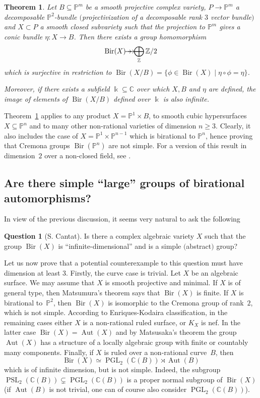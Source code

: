 \documentclass[JEP,XML,SOM,Unicode,NoFloatCountersInSection]{cedram}
\newcommand{\tto}{\mathchoice{\to\hspace*{-5mm}\to}{\to\hspace*{-2.85mm}\to}{\to\hspace*{-3mm}\to}{\to\hspace*{-3mm}\to}}
\DeclareMathOperator{\Bir}{Bir}
\DeclareMathOperator{\Aut}{Aut}
\DeclareMathOperator{\PGL}{PGL}
\DeclareMathOperator{\PSL}{PSL}
\theoremstyle{plain}
\newtheorem{thm}{Theorem}[section]
\theoremstyle{definition}
\newtheorem*{question}{Question}
\newcommand{\CC}{\mathbb C}
\newcommand{\kk}{\Bbbk}
\newcommand{\PP}{\mathbb P}
\newcommand{\ZZ}{\mathbb Z}
\begin{document}
\begin{thm}\label{thm: BLZ 1}
Let $B\subseteq \PP^m$ be a smooth projective complex variety, $P\to \PP^m$ a decomposable $\PP^2$-bundle $($projectivization of a decomposable rank $3$ vector bundle$)$ and $X\subset P$ a smooth closed subvariety such that the projection to $\PP^m$ gives a conic bundle $\eta\colon X\to B$.
Then there exists a group homomorphism
\[\Bir(X)\tto \bigoplus_\ZZ \ZZ/2\]
which is surjective in restriction to $\Bir(X/B)=\{\phi\in \Bir(X)\mid \eta\circ\phi=\eta\}$.

Moreover, if there exists a subfield $\kk\subseteq \CC$ over which $X,B$ and $\eta$ are defined, the image of elements of $\Bir(X/B)$ defined over $\kk$ is also infinite.
\end{thm}

Theorem~\ref{thm: BLZ 1} applies to any product $X = \PP^1 \times B$, to smooth cubic hypersurfaces $X \subseteq \PP^{n}$ and to many other non-rational varieties of dimension $n \ge 3$. Clearly, it also includes the case of $X = \PP^1 \times \PP^{n-1}$ which is birational to $\PP^n$, hence proving that Cremona groups $\Bir(\PP^n)$ are not simple. For a version of this result in dimension~$2$ over a non-closed field, see \cite{Schneider}.

\subsection{Are there simple ``large'' groups of birational automorphisms?} In view of the previous discussion, it seems very natural to ask the following

\begin{question}[S. Cantat]
Is there a complex algebraic variety $X$ such that the group $\Bir(X)$ is ``infinite-dimensional'' and is a simple $($abstract$)$ group?
\end{question}

Let us now prove that a potential counterexample to this question must have dimension at least $3$. Firstly, the curve case is trivial. Let $X$ be an algebraic surface. We may assume that $X$ is smooth projective and minimal. If $X$ is of general type, then Matsumura's theorem \cite{Matsumura} says that $\Bir(X)$ is finite. If $X$ is birational to~$\PP^2$, then $\Bir(X)$ is isomorphic to the Cremona group of rank~$2$, which is not simple. According to Enriques-Kodaira classification, in the remaining cases either $X$ is a non-rational ruled surface, or $K_X$ is nef. In the latter case $\Bir(X)=\Aut(X)$ and by Matsusaka's theorem \cite{Matsusaka} the group $\Aut(X)$ has a structure of a locally algebraic group with finite or countably many components. Finally, if $X$ is ruled over a non-rational curve~$B$, then
\[
\Bir(X)\simeq\PGL_2(\CC(B))\rtimes\Aut(B)
\]
which is of infinite dimension, but is not simple. Indeed, the subgroup $\PSL_2(\CC(B))\subsetneq \PGL_2(\CC(B))$ is a proper normal subgroup of $\Bir(X)$ (if $\Aut(B)$ is not trivial, one can of course also consider $\PGL_2(\CC(B))$).
\end{document}
